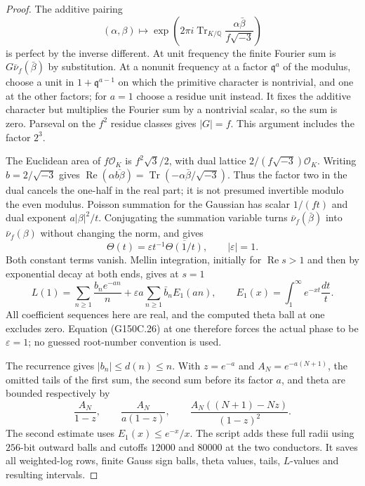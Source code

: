 \begin{proof}
The additive pairing
\[
 (\alpha,\beta)\longmapsto
 \exp\left(2\pi i\operatorname{Tr}_{K/\mathbb Q}
                    \frac{\alpha\bar\beta}{f\sqrt{-3}}\right)
 \tag{G150C.25}
\]
is perfect by the inverse different.
At unit frequency the finite Fourier sum is
$G\bar\nu_f(\bar\beta)$ by substitution.
At a nonunit frequency at a factor $\mathfrak q^a$ of the
modulus, choose a unit in $1+\mathfrak q^{a-1}$ on which the
primitive character is nontrivial, and one at the other factors;
for $a=1$ choose a residue unit instead.
It fixes the additive character but multiplies the Fourier sum
by a nontrivial scalar, so the sum is zero.
Parseval on the $f^2$ residue classes gives $|G|=f$.
This argument includes the factor $2^3$.

The Euclidean area of $f\mathcal O_K$ is $f^2\sqrt3/2$, with
dual lattice $2/(f\sqrt{-3})\mathcal O_K$.
Writing $b=2/\sqrt{-3}$ gives
$\operatorname{Re}(\alpha\overline{b\beta})
=\operatorname{Tr}(-\alpha\bar\beta/\sqrt{-3})$.
Thus the factor two in the dual cancels the one-half in the
real part; it is not presumed invertible modulo the even modulus.
Poisson summation for the Gaussian has scalar $1/(ft)$ and
dual exponent $a|\beta|^2/t$.
Conjugating the summation variable turns
$\bar\nu_f(\bar\beta)$ into $\bar\nu_f(\beta)$ without
changing the norm, and gives
\[
 \Theta(t)=\varepsilon t^{-1}\overline{\Theta(1/t)},
                        \qquad |\varepsilon|=1.
 \tag{G150C.26}
\]
Both constant terms vanish.
Mellin integration, initially for $\operatorname{Re}s>1$ and
then by exponential decay at both ends, gives at $s=1$
\[
 L(1)=\sum_{n\ge1}\frac{b_ne^{-an}}n
       +\varepsilon a\sum_{n\ge1}\bar b_n E_1(an),\qquad
 E_1(x)=\int_1^\infty e^{-xt}\frac{dt}{t}.
 \tag{G150C.27}
\]
All coefficient sequences here are real, and the computed theta
ball at one excludes zero.  Equation (G150C.26) at one therefore
forces the actual phase to be $\varepsilon=1$; no guessed
root-number convention is used.

The recurrence gives $|b_n|\le d(n)\le n$.
With $z=e^{-a}$ and $A_N=e^{-a(N+1)}$, the omitted tails of
the first sum, the second sum before its factor $a$, and theta
are bounded respectively by
\[
 \frac{A_N}{1-z},\qquad \frac{A_N}{a(1-z)},\qquad
                  \frac{A_N((N+1)-Nz)}{(1-z)^2}.
 \tag{G150C.28}
\]
The second estimate uses $E_1(x)\le e^{-x}/x$.
The script adds these full radii using $256$-bit outward balls
and cutoffs $12000$ and $80000$ at the two conductors.
It saves all weighted-log rows, finite Gauss sign balls,
theta values, tails, $L$-values and resulting intervals.


\end{proof}
